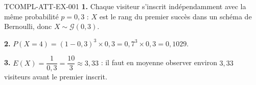 \begin{corrige}{TCOMPL-ATT-EX-001}
\textbf{1.} Chaque visiteur s'inscrit indépendamment avec la même probabilité $p=0{,}3$ : $X$ est le rang du premier succès dans un schéma de Bernoulli, donc $X\sim\mathcal{G}(0{,}3)$.

\textbf{2.} $P(X=4) = (1-0{,}3)^3\times0{,}3 = 0{,}7^3\times0{,}3 = 0{,}1029$.

\textbf{3.} $E(X) = \dfrac{1}{0{,}3} = \dfrac{10}{3} \approx 3{,}33$ : il faut en moyenne observer environ $3{,}33$ visiteurs avant le premier inscrit.
\end{corrige}

